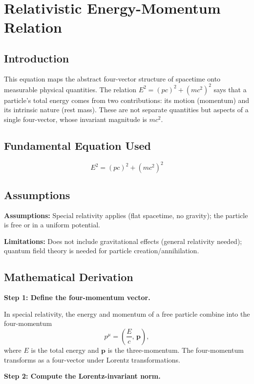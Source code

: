 \chapter{Relativistic Energy-Momentum Relation}

\section*{Introduction}

This equation maps the abstract four-vector structure of spacetime onto measurable physical quantities. The relation $E^2 = (pc)^2 + (mc^2)^2$ says that a particle's total energy comes from two contributions: its motion (momentum) and its intrinsic nature (rest mass). These are not separate quantities but aspects of a single four-vector, whose invariant magnitude is $mc^2$.
\section*{Fundamental Equation Used}

\begin{equation}
E^2 = (pc)^2 + (mc^2)^2
\end{equation}
\section*{Assumptions}

\textbf{Assumptions:} Special relativity applies (flat spacetime, no gravity); the particle is free or in a uniform potential.


\textbf{Limitations:} Does not include gravitational effects (general relativity needed); quantum field theory is needed for particle creation/annihilation.


\section*{Mathematical Derivation}

\textbf{Step 1: Define the four-momentum vector.}

In special relativity, the energy and momentum of a free particle combine into the four-momentum
\begin{equation}
p^\mu = \left(\frac{E}{c},\,\mathbf{p}\right),
\end{equation}
where $E$ is the total energy and $\mathbf{p}$ is the three-momentum. The four-momentum transforms as a four-vector under Lorentz transformations.

\textbf{Step 2: Compute the Lorentz-invariant norm.}

